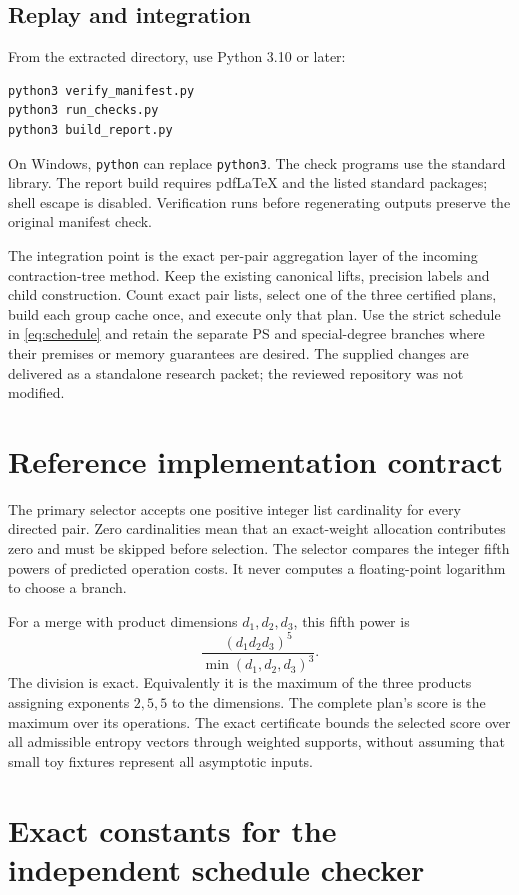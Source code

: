\documentclass[11pt]{article}
\theoremstyle{remark}\newtheorem{remark}[theorem]{Remark}
\begin{document}
\subsection{Replay and integration}
From the extracted directory, use Python 3.10 or later:
\begin{lstlisting}
python3 verify_manifest.py
python3 run_checks.py
python3 build_report.py
\end{lstlisting}
On Windows, \texttt{python} can replace \texttt{python3}. The check programs
use the standard library. The report build requires pdfLaTeX and the listed
standard packages; shell escape is disabled. Verification runs before
regenerating outputs preserve the original manifest check.

The integration point is the exact per-pair aggregation layer of the
incoming contraction-tree method. Keep the existing canonical lifts,
precision labels and child construction. Count exact pair lists, select one
of the three certified plans, build each group cache once, and execute only
that plan. Use the strict schedule in \eqref{eq:schedule} and retain the
separate PS and special-degree branches where their premises or memory
guarantees are desired. The supplied changes are delivered as a standalone
research packet; the reviewed repository was not modified.

\appendix
\section{Reference implementation contract}

The primary selector accepts one positive integer list cardinality for every
directed pair. Zero cardinalities mean that an exact-weight allocation
contributes zero and must be skipped before selection. The selector compares
the integer fifth powers of predicted operation costs. It never computes a
floating-point logarithm to choose a branch.

For a merge with product dimensions $d_1,d_2,d_3$, this fifth power is
\[
 \frac{(d_1d_2d_3)^5}{\min(d_1,d_2,d_3)^3}.
\]
The division is exact. Equivalently it is the maximum of the three products
assigning exponents $2,5,5$ to the dimensions. The complete plan's score is
the maximum over its operations. The exact certificate bounds the selected
score over all admissible entropy vectors through weighted supports,
without assuming that small toy fixtures represent all asymptotic inputs.

\section{Exact constants for the independent schedule checker}
\end{document}
